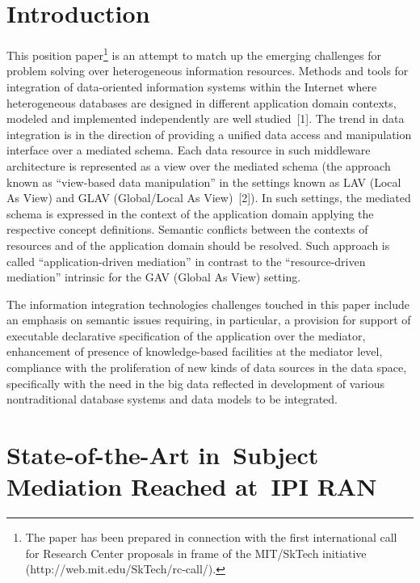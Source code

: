 
      \thispagestyle{headings}

      \begin{multicols}{2}

            \label{st\stat}

\section{Introduction}

\noindent
This position paper\footnote[4]{The paper has been prepared in connection with the first international call for Research 
Center proposals in frame of the MIT/SkTech initiative ({\sf http://web.mit.edu/SkTech/rc-call/}).} is an 
attempt to match up the emerging challenges for problem solving over heterogeneous information 
resources. Methods and tools for integration of data-oriented information systems within the Internet 
where heterogeneous databases are designed in different application domain contexts, modeled and 
implemented independently are well studied~[1]. The trend in data integration is in the direction of 
providing a unified data access and manipulation interface over a mediated schema. Each data resource in 
such middleware architecture is represented as a view over the mediated schema (the approach known as 
``view-based data manipulation'' in the settings known as LAV (Local As View)
and GLAV (Global/Local As View)~[2]). In such settings, the 
mediated schema is expressed in the context of the application domain applying the respective concept 
definitions. Semantic conflicts between the contexts of resources and of the application domain should be 
resolved. Such approach is called ``application-driven mediation'' in contrast to the ``resource-driven 
mediation'' intrinsic for the GAV (Global As View) setting.

The information integration technologies challenges touched in this paper include an emphasis on 
semantic issues requiring, in particular, a provision for support of executable declarative specification of 
the application over the mediator, enhancement of presence of knowledge-based facilities at the mediator 
level, compliance with the proliferation of new kinds of data sources in the data space, specifically with 
the need in the big data reflected in development of various nontraditional database systems and data 
models to be integrated.

\section{State-of-the-Art in~Subject Mediation Reached at~IPI RAN}


\end{multicols}

